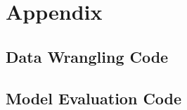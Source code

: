 
\section{Appendix}

\subsection{Data Wrangling Code}

\begin{figure}[h]
    
\end{figure}

\newpage

\subsection{Model Evaluation Code}

\begin{figure}[h]
    
\end{figure}